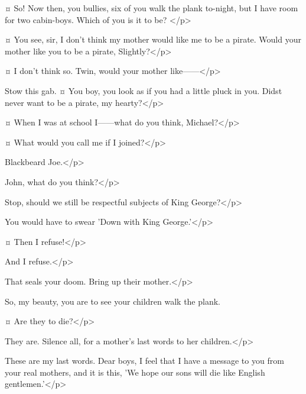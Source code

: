 \begin{drama}

\hookspeaks {}¤
So!
Now then, you bullies, six of you walk the plank to-night, but I have room for two cabin-boys.
Which of you is it to be?
</p>

\tootlesspeaks {}¤
You see, sir, I don't think my mother would like me to be a pirate.
Would your mother like you to be a pirate, Slightly?</p>

\slightlyspeaks {}¤
I don't think so.
Twin, would your mother like——</p>

\hookspeaks
Stow this gab.
¤
You boy, you look as if you had a little pluck in you.
Didst never want to be a pirate, my hearty?</p>

\johnspeaks {}¤
When I was at school I——what do you think, Michael?</p>

\michaelspeaks {}¤
What would you call me if I joined?</p>

\hookspeaks
Blackbeard Joe.</p>

\michaelspeaks
John, what do you think?</p>

\johnspeaks
Stop, should we still be respectful subjects of King George?</p>

\hookspeaks
You would have to swear 'Down with King George.'</p>

\johnspeaks {}¤
Then I refuse!</p>

\michaelspeaks
And I refuse.</p>

\hookspeaks
That seals your doom.
Bring up their mother.</p>


So, my beauty, you are to see your children walk the plank.

\wendyspeaks {}¤
Are they to die?</p>

\hookspeaks
They are.
Silence all, for a mother's last words to her children.</p>

\wendyspeaks
These are my last words.
Dear boys, I feel that I have a message to you from your real mothers, and it is this,
'We hope our sons will die like English gentlemen.'</p>


\end{drama}
